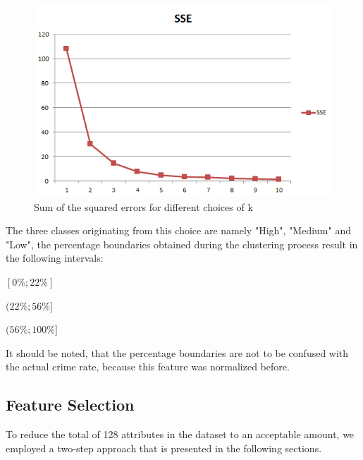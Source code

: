 \begin{figure}[H]
  \centering
  \includegraphics[width=\columnwidth]{../../charts/SSE.png}
  \caption{Sum of the squared errors for different choices of k}
  \label{fig:sse}
\end{figure}
\vspace*{-0.2cm}
\noindent The three classes originating from this choice are namely
"High", "Medium" and "Low", the percentage boundaries obtained during the clustering process result in the following intervals:
\begin{description}
  \setlength{\itemsep}{-2pt}
\item[Low:] \([0\%; 22\%]\) 
\item[Medium:] \((22\%; 56\%]\)
\item[High:] \((56\%; 100\%]\)
\end{description}
It should be noted, that the percentage boundaries are not to be confused with the actual crime rate, because this feature was normalized before. 

\subsection{Feature Selection}
\label{sec:feature_selection}    

To reduce the total of 128 attributes in the dataset to an acceptable
amount, we employed a two-step approach that is presented in the
following sections.


